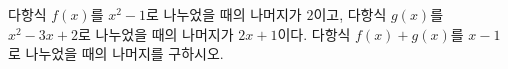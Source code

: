 다항식 $f(x)$를 $x^2-1$로 나누었을 때의 나머지가 $2$이고, 다항식 $g(x)$를 $x^2-3x+2$로 나누었을 때의 나머지가 $2x+1$이다. 다항식 $f(x)+g(x)$를 $x-1$로 나누었을 때의 나머지를 구하시오.
